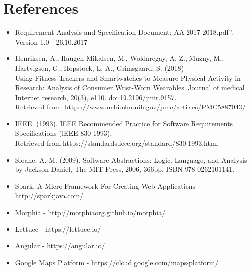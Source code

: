 \documentclass[a4paper, hidelinks, 12pt]{report}
\begin{document}
	\chapter{References}
	\begin{itemize}
		\item Requirement Analysis and Specification Document: AA 2017-2018.pdf”. Version 1.0 - 26.10.2017
		\item Henriksen, A., Haugen Mikalsen, M., Woldaregay, A. Z., Muzny, M., Hartvigsen, G., Hopstock, L. A., Grimsgaard, S. (2018)
		\\Using Fitness Trackers and Smartwatches to Measure Physical Activity in Research: Analysis of Consumer Wrist-Worn Wearables. Journal of medical Internet research, 20(3), e110. doi:10.2196/jmir.9157.
		\\Retrieved from: https://www.ncbi.nlm.nih.gov/pmc/articles/PMC5887043/
		\item IEEE. (1993). IEEE Recommended Practice for Software Requirements Specifications (IEEE 830-1993).
		\\Retrieved from https://standards.ieee.org/standard/830-1993.html
		\item Sloane, A. M. (2009). Software Abstractions: Logic, Language, and Analysis by Jackson Daniel, The MIT Press, 2006, 366pp, ISBN 978-0262101141.
		\item{Spark. A Micro Framework For Creating Web Applications - http://sparkjava.com/}
		\item{Morphia - http://morphiaorg.github.io/morphia/}
		\item{Lettuce - https://lettuce.io/}
		\item{Angular - https://angular.io/}
		\item{Google Maps Platform - https://cloud.google.com/maps-platform/}
		
	\end{itemize}
	
\end{document}
